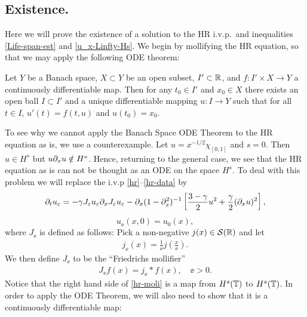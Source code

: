 \subsection{Existence.}
\label{existence}
Here we will prove the existence of a solution to the HR i.v.p.\
and inequalities
\eqref{Life-span-est} and \eqref{u_x-Linfty-Hs}.  We begin by mollifying the HR equation, so that we may apply the following ODE
theorem: 
%
\begin{theorem}
\label{ode_theorem}
Let  $Y$  be a Banach space, $X\subset Y$ be an open subset,
$I' \subset \mathbb{R}$, and $f: I' \times X\to Y$ a continuously differentiable
map.  Then for any $t_{0} \in I'$ and $x_{0} \in X$ there exists an
open ball $I \subset I'$ and a unique differentiable mapping $u:I
\to Y$ such that for all $t \in I$,  $u'(t) = f(t, u)$
and $u(t_{0}) = x_{0}$.
\end{theorem}
%
To see why we cannot apply the Banach Space ODE Theorem to the HR equation as
is, we use a counterexample. Let $u=x^{-1/2} \chi_{[0,1]}$ and $s=0$. Then $u
\in H^s$ but $u\partial_x u \notin H^s$. Hence, returning to the general case, we see
that the HR equation as is can not be thought as an ODE on the space $H^s$. To
deal with this problem we will replace the i.v.p \eqref{hr}--\eqref{hr-data} by  
\begin{equation}
\label{hr-moli}
\partial_t  u_\varepsilon =
-\gamma J_\varepsilon u_\varepsilon \partial_x  J_\varepsilon  u_\varepsilon - \partial_x (1-\partial_x^2)^{-1} 
\left[\frac{3-\gamma}{2}u^2 + \frac{\gamma}{2}(\partial_x u)^2 \right],
\end{equation} 
%
\begin{equation} 
\label{hr-moli-data} 
u_\ee(x, 0) = u_0 (x),
\end{equation}
%
where $J_\ee$ is defined as follows: Pick a non-negative $j(x) \in
\mathcal{S}(\mathbb{R})$ and let
\begin{equation*}
\begin{split}
j_\ee(x) = \frac{1}{\ee}j\left( \frac{x}{\ee} \right).
\end{split}
\end{equation*}
We then define $J_\ee$ to be the ``Friedrichs mollifier''
\begin{equation}
\begin{split}
J_\ee f(x) = j_\ee * f(x), \quad \ee>0.
\end{split}
\end{equation}
%
%
Notice that the right hand side of \eqref{hr-moli} is a map from $H^s(\mathbb{T})$
to $H^s(\mathbb{T})$.  In order to apply the ODE Theorem, we will also need to
show that it is a continuously differentiable map:
